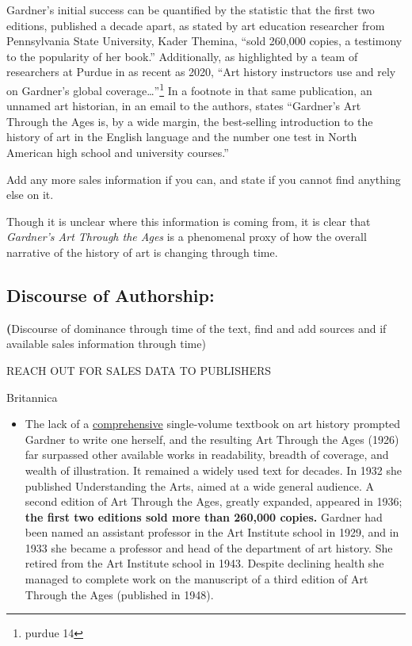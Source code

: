 \documentclass[
  letterpaper,
  DIV=11,
  numbers=noendperiod]{scrreprt}
\providecommand{\tightlist}{%
  \setlength{\itemsep}{0pt}\setlength{\parskip}{0pt}}
\begin{document}
Gardner's initial success can be quantified by the statistic that the
first two editions, published a decade apart, as stated by art education
researcher from Pennsylvania State University, Kader Themina, ``sold
260,000 copies, a testimony to the popularity of her book.''
Additionally, as highlighted by a team of researchers at Purdue in as
recent as 2020, ``Art history instructors use and rely on Gardner's
global coverage\ldots{}''\footnote{purdue 14} In a footnote in that same
publication, an unnamed art historian, in an email to the authors,
states ``Gardner's Art Through the Ages is, by a wide margin, the
best-selling introduction to the history of art in the English language
and the number one test in North American high school and university
courses.''

Add any more sales information if you can, and state if you cannot find
anything else on it.

Though it is unclear where this information is coming from, it is clear
that \emph{Gardner's Art Through the Ages} is a phenomenal proxy of how
the overall narrative of the history of art is changing through time.

\hypertarget{discourse-of-authorship}{%
\subsection{Discourse of Authorship:}\label{discourse-of-authorship}}

\textbf{(}Discourse of dominance through time of the text, find and add
sources and if available sales information through time)

REACH OUT FOR SALES DATA TO PUBLISHERS

Britannica

\begin{itemize}
\tightlist
\item
  The lack of a
  \href{https://www.merriam-webster.com/dictionary/comprehensive}{comprehensive}
  single-volume textbook on art history prompted Gardner to write one
  herself, and the resulting Art Through the Ages (1926) far surpassed
  other available works in readability, breadth of coverage, and wealth
  of illustration. It remained a widely used text for decades. In 1932
  she published Understanding the Arts, aimed at a wide general
  audience. A second edition of Art Through the Ages, greatly expanded,
  appeared in 1936; \textbf{the first two editions sold more than
  260,000 copies.} Gardner had been named an assistant professor in the
  Art Institute school in 1929, and in 1933 she became a professor and
  head of the department of art history. She retired from the Art
  Institute school in 1943. Despite declining health she managed to
  complete work on the manuscript of a third edition of Art Through the
  Ages (published in 1948).
\end{itemize}
\end{document}
